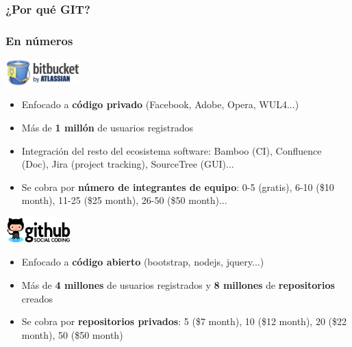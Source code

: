\frame
{
\frametitle{¿Por qué GIT?}
}
\usebackgroundtemplate{}
\frame
{
\frametitle{En números}
\includegraphics[height=1cm]{imgs/git-bitbucket.png}
\begin{itemize}
 \item Enfocado a \textbf{código privado} (Facebook, Adobe, Opera, WUL4...)
 \item Más de \textbf{1 millón} de usuarios registrados
 \item Integración del resto del ecosistema software: Bamboo (CI), Confluence (Doc), Jira (project tracking), SourceTree (GUI)...
 \item Se cobra por \textbf{número de integrantes de equipo}: 0-5 (gratis), 6-10 (\$10 month), 11-25 (\$25 month), 26-50 (\$50 month)...
\end{itemize}

\includegraphics[height=1cm]{imgs/git-github.png}
\begin{itemize}
 \item Enfocado a \textbf{código abierto} (bootstrap, nodejs, jquery...)
 \item Más de \textbf{4 millones} de usuarios registrados y \textbf{8 millones} de \textbf{repositorios} creados
 \item Se cobra por \textbf{repositorios privados}: 5 (\$7 month), 10 (\$12 month), 20 (\$22 month), 50 (\$50 month)
\end{itemize}
}
